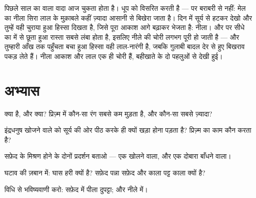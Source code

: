 \begin{remark}[सूर्यास्त का पूरा दाम चुका दिया गया]\label{rem:g8:colors-spectra:sunset}
पिछले साल का  वाला वादा आज चुकता होता है।  धूप को विसरित
करती है --- पर बराबरी से नहीं: मेल का नीला सिरा लाल के मुक़ाबले कहीं
ज़्यादा आसानी से बिखेरा जाता है। दिन में सूर्य से हटकर देखो और
तुम्हें वही चुराया हुआ हिस्सा दिखता है, जिसे पूरा आकाश आगे बढ़ाकर
भेजता है: नीला। और  पर सीधे  का  में से छूता हुआ
रास्ता सबसे लंबा होता है, इसलिए नीले की चोरी लगभग पूरी हो जाती है ---
और तुम्हारी आँख तक पहुँचता बचा हुआ हिस्सा वही लाल-नारंगी है, जबकि
गुलाबी बादल देर से हुए बिखराव पकड़ लेते हैं। नीला आकाश और लाल 
एक ही चोरी हैं, बहीखाते के दो पहलुओं से देखी हुई।
\end{remark}

\section{अभ्यास}

\begin{exercise}[$\star$]\label{exo:g8:colors-spectra:1}
 क्या है, और  क्या? प्रिज़्म में कौन-सा रंग सबसे कम
मुड़ता है, और कौन-सा सबसे ज़्यादा?
\end{exercise}

\begin{exercise}[$\star$]\label{exo:g8:colors-spectra:2}
इंद्रधनुष खोजने वाले को सूर्य की ओर पीठ करके ही क्यों खड़ा होना पड़ता
है? प्रिज़्म का काम कौन करता है?
\end{exercise}

\begin{exercise}[$\star$]\label{exo:g8:colors-spectra:3}
सफ़ेद  के मिश्रण होने के दोनों प्रदर्शन बताओ --- एक खोलने वाला,
और एक दोबारा बाँधने वाला।
\end{exercise}

\begin{exercise}[$\star$]\label{exo:g8:colors-spectra:4}
घटाव की ज़बान में: घास हरी क्यों है? सफ़ेद पन्ना सफ़ेद और काला
पट्ट काला क्यों है?
\end{exercise}

\begin{exercise}[$\star$]\label{exo:g8:colors-spectra:5}
विधि से भविष्यवाणी करो: सफ़ेद  में पीला दुपट्टा; और नीले 
में।
\end{exercise}

